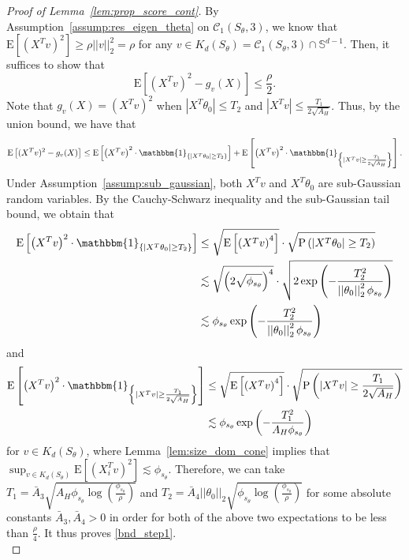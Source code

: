 \documentclass[ejsv2,noshowframe]{imsart}
\theoremstyle{plain}
\theoremstyle{definition}
\theoremstyle{remark}
\newcommand{\norm}[1]{\left|\left| #1 \right|\right|}
\begin{document}
\begin{proof}[Proof of Lemma~\ref{lem:prop_score_cont}]
	 By Assumption~\ref{assump:res_eigen_theta} on $\mathcal{C}_1(S_{\theta},3)$, we know that $\mathrm{E}\left[(X^T v)^2\right] \geq \rho \norm{v}_2^2 = \rho$ for any $v \in K_d(S_{\theta}) = \mathcal{C}_1(S_{\theta},3) \cap \mathbb{S}^{d-1}$. Then, it suffices to show that
	$$\mathrm{E}\left[(X^T v)^2 - g_v(X)\right] \leq \frac{\rho}{2}.$$
	Note that $g_v(X) = (X^Tv)^2$ when $|X^T\theta_0| \leq T_2$ and $|X^T v| \leq \frac{T_1}{2\sqrt{A_H}}$. Thus, by the union bound, we have that
	$$\mathrm{E}\left[(X^T v)^2 - g_v(X)\right] \leq \mathrm{E}\left[\left(X^T v\right)^2 \cdot \mathbbm{1}_{\left\{|X^T\theta_0| \geq T_2\right\}}\right] + \mathrm{E}\left[\left(X^T v\right)^2 \cdot \mathbbm{1}_{\left\{|X^Tv| \geq \frac{T_1}{2\sqrt{A_H}}\right\}} \right].$$
	Under Assumption~\ref{assump:sub_gaussian}, both $X^Tv$ and $X^T\theta_0$ are sub-Gaussian random variables. By the Cauchy-Schwarz inequality and the sub-Gaussian tail bound, we obtain that
	\begin{align*}
		\mathrm{E}\left[\left(X^T v\right)^2 \cdot \mathbbm{1}_{\left\{|X^T\theta_0| \geq T_2\right\}} \right] &\leq \sqrt{\mathrm{E}\left[\left(X^T v\right)^4\right]} \cdot \sqrt{\mathrm{P}\left(|X^T\theta_0| \geq T_2\right)}\\
		&\lesssim \sqrt{\left(2 \sqrt{\phi_{s_{\theta}}} \right)^4} \cdot \sqrt{2\exp\left(- \frac{T_2^2}{ \norm{\theta_0}_2^2 \phi_{s_{\theta}}} \right)}\\
		&\lesssim \phi_{s_{\theta}} \exp\left(-\frac{T_2^2}{ \norm{\theta_0}_2^2 \phi_{s_{\theta}}} \right)
	\end{align*}
	and
	\begin{align*}
		\mathrm{E}\left[\left(X^T v\right)^2 \cdot \mathbbm{1}_{\left\{|X^Tv| \geq \frac{T_1}{2\sqrt{A_H}}\right\}} \right] &\leq \sqrt{\mathrm{E}\left[\left(X^T v\right)^4\right]} \cdot \sqrt{\mathrm{P}\left(\left|X^T v\right| \geq \frac{T_1}{2\sqrt{A_H}}\right)}\\
		&\lesssim \phi_{s_{\theta}} \exp\left(-\frac{T_1^2}{A_H  \phi_{s_{\theta}}} \right)
	\end{align*}
	for $v\in K_d(S_{\theta})$, where Lemma~\ref{lem:size_dom_cone} implies that $\sup_{v\in K_d(S_{\theta})} \mathrm{E}\left[\left(X_i^T v\right)^2\right] \lesssim \phi_{s_{\theta}}$.  
	Therefore, we can take $T_1 =\bar{A}_3 \sqrt{A_H \phi_{s_{\theta}} \log\left(\frac{\phi_{s_{\theta}}}{\rho} \right)}$ and $T_2 = \bar{A}_4\norm{\theta_0}_2 \sqrt{\phi_{s_{\theta}}\log\left(\frac{\phi_{s_{\theta}}}{\rho} \right)}$ for some absolute constants $\bar{A}_3,\bar{A}_4>0$ in order for both of the above two expectations to be less than $\frac{\rho}{4}$. It thus proves \eqref{bnd_step1}.\\
	

\end{proof}
\end{document}
